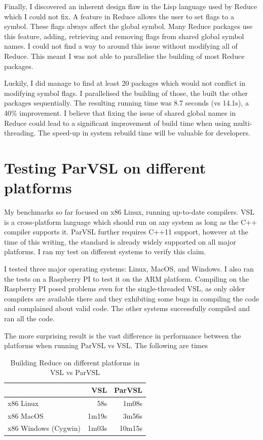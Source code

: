 Finally, I discovered an inherent design flaw in the Lisp language used by Reduce which I could not
fix. A feature in Reduce allows the user to set flags to a symbol. These flags always affect the global
symbol. Many Reduce packages use this feature, adding, retrieving and removing flags from shared
global symbol names. I could not find a way to around this issue without modifying all of Reduce.
This meant I was not able to parallelise the building of most Reduce packages.

Luckily, I did manage to find at least 20 packages which would not conflict in modifying symbol flags.
I parallelised the building of those, the built the other packages sequentially. The resulting
running time was 8.7 seconds (vs 14.1s), a 40\% improvement.
I believe that fixing the issue of shared global names in Reduce could lead to a significant improvement
of build time when using multi-threading. The speed-up in system rebuild time will be valuable for
developers.

\section{Testing ParVSL on different platforms}
\label{sec:crossplatform}

My benchmarks so far focused on x86 Linux, running
up-to-date compilers. VSL is a cross-platform language which should run on any system as long as the
C++ compiler supports it. ParVSL further requires C++11 support, however at the
time of this writing, the standard is already widely supported on all major platforms.
I ran my test on different systems to verify this claim.

I tested three major operating systems: Linux, MacOS, and Windows. I also
ran the tests on a Raspberry PI to test it on the ARM platform. Compiling on the Raspberry PI
posed problems even for the single-threaded VSL, as only older compilers are available
there and they exhibiting some bugs in compiling the code and complained about valid code.
The other systems successfully compiled and ran all the code.

The more surprising result is the vast difference in performance between the platforms
when running ParVSL vs VSL. The following are times

\begin{table}
  \centering
  \begin{tabular}{lrr}
                       & VSL    & ParVSL \\
  \hline
  x86 Linux            &   58s &  1m08s \\
  x86 MacOS            & 1m19s &  3m56s  \\
  x86 Windows (Cygwin) & 1m03s & 10m15s \\
  \end{tabular}
  \caption{Building Reduce on different platforms in VSL vs ParVSL}
  \label{table:cross-platform-reduce}
\end{table}


